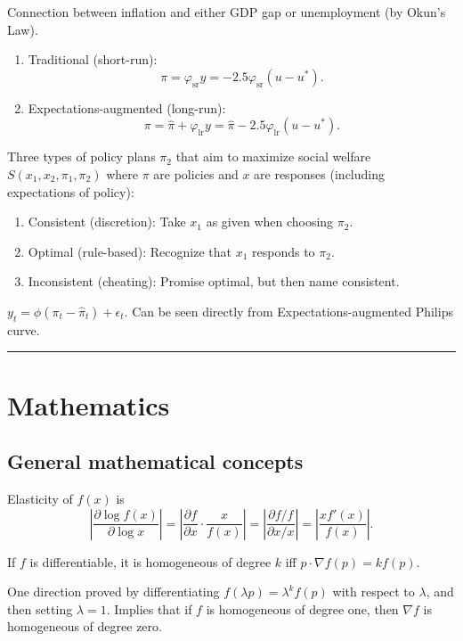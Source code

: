 \documentclass[8pt,letterpaper, landscape]{extarticle} %
\renewcommand{\ln}{\log}
\begin{document}
\begin{multicols}{3}
\begin{description}
 Connection between inflation and either GDP gap or unemployment (by Okun's Law).
\begin{enumerate}
\item Traditional (short-run):
$$ \pi = \varphi_{\text{sr}} y = -2.5 \varphi_{\text{sr}} (u - u^*) . $$
\item Expectations-augmented (long-run):
$$ \pi = \hat{\pi} + \varphi_{\text{lr}} y = \hat{\pi} - 2.5 \varphi_{\text{lr}} (u - u^*) . $$
\end{enumerate}

 Three types of policy plans $ \pi_2 $ that aim to maximize social welfare $ S (x_1, x_2, \pi_1 , \pi_2 ) $ where $ \pi $  are policies and $ x $ are responses (including expectations of policy):
\begin{enumerate}
\item Consistent (discretion): Take $ x_1 $ as given when choosing $ \pi_2 $.
\item Optimal (rule-based): Recognize that $ x_1 $ responds to $ \pi_2 $.
\item Inconsistent (cheating): Promise optimal, but then name consistent.
\end{enumerate}

 $ y_t = \phi (\pi_t - \hat{\pi}_t) + \epsilon_t  $. Can be seen directly from Expectations-augmented Philips curve. 

\hrule
\section{Mathematics}
\subsection{General mathematical concepts}
 Elasticity of $ f(x) $ is
$$ \left| \dfrac{\partial \ln f(x)}{\partial \ln x} \right| = \left| \frac{\partial f}{\partial x} \cdot \frac{x}{f(x)} \right| = \left| \frac{\partial f / f}{\partial x / x} \right| = \left| \frac{x f'(x)}{f(x)} \right| .$$

 If $ f $ is differentiable, it is homogeneous of degree $ k $ iff $ p \cdot \nabla f(p) = k f(p) $.

One direction proved by differentiating $ f(\lambda p) = \lambda^k f(p) $ with respect to $ \lambda $, and then setting $ \lambda = 1 $. Implies that if $ f $ is homogeneous of degree one, then $ \nabla f $ is homogeneous of degree zero.


\end{description}
\end{multicols}
\end{document}
